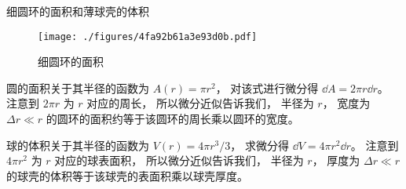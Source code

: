 \begin{example}{细圆环的面积和薄球壳的体积}\label{ex_Diff_2}
\begin{figure}[ht]
\centering
\texttt{[image: ./figures/4fa92b61a3e93d0b.pdf]}
\caption{细圆环的面积} \label{fig_Diff_2}
\end{figure}
圆的面积关于其半径的函数为 $A(r) = \pi r^2$， 对该式进行微分得 $\dd{A} = 2\pi r\dd{r}$。 注意到 $2\pi r$ 为 $r$ 对应的周长， 所以微分近似告诉我们， 半径为 $r$， 宽度为 $\Delta r \ll r$ 的圆环的面积约等于该圆环的周长乘以圆环的宽度。

球的体积关于其半径的函数为 $V(r) = 4\pi r^3/3$， 求微分得 $\dd{V} = 4\pi r^2 \dd{r}$。 注意到 $4\pi r^2$ 为 $r$ 对应的球表面积， 所以微分近似告诉我们， 半径为 $r$， 厚度为 $\Delta r \ll r$ 的球壳的体积等于该球壳的表面积乘以球壳厚度。
\end{example}
